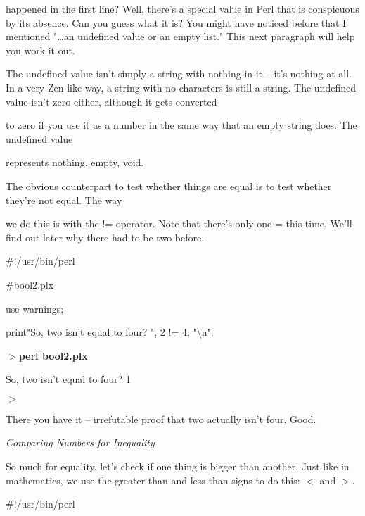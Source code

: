 \documentclass[a4paper,11pt]{book}
\begin{document}
\noindent happened in the first line? Well, there's a special value in Perl that is conspicuous by its absence. Can you guess what it is? You might have noticed before that I mentioned "\dots  an undefined value or an empty list." This next paragraph will help you work it out.

\noindent 

\noindent The undefined value isn't simply a string with nothing in it -- it's nothing at all. In a very Zen-like way, a string with no characters is still a string. The undefined value isn't zero either, although it gets converted

\noindent to zero if you use it as a number in the same way that an empty string does. The undefined value

\noindent represents nothing, empty, void.

\noindent 

\noindent The obvious counterpart to test whether things are equal is to test whether they're not equal. The way

\noindent we do this is with the != operator. Note that there's only one = this time. We'll find out later why there had to be two before.

\noindent 

\noindent 

\noindent \#!/usr/bin/perl

\noindent \#bool2.plx

\noindent use warnings;

\noindent print"So, two isn't equal to four? ", 2 != 4, "\textbackslash n";

\noindent 

\noindent $>$\textbf{perl bool2.plx}

\noindent So, two isn't equal to four? 1

\noindent $>$

\noindent 

\noindent There you have it -- irrefutable proof that two actually isn't four. Good.

\noindent 

\noindent \textit{Comparing Numbers for Inequality}

\noindent So much for equality, let's check if one thing is bigger than another. Just like in mathematics, we use the greater-than and less-than signs to do this: $<$ and $>$.

\noindent 

\noindent 

\noindent \#!/usr/bin/perl
\end{document}
